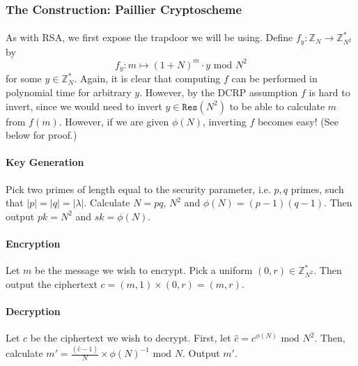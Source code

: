 \documentclass{article}
\theoremstyle{definition}
\theoremstyle{example}
\newcommand{\Int}{\mathbb{Z}}
\renewcommand{\mod}{\,\,\text{mod}\,\,}
\begin{document}
\subsubsection{The Construction: Paillier Cryptoscheme}
\paragraph{} As with RSA, we first expose the trapdoor we will be using. Define
$f_y: \Int_N \to \Int_{N^2}^*$ by
\[
  f_y: m \mapsto (1 + N)^m \cdot y \mod N^2 
\]
for some $y \in \Int_N^*$. Again, it is clear that computing $f$ can be
performed in polynomial time for arbitrary $y$. However, by the DCRP assumption
$f$ is hard to invert, since we would need to invert $y \in \texttt{Res}(N^2)$
to be able to calculate $m$ from $f(m)$. However, if we are given $\phi(N)$,
inverting $f$ becomes easy! (See below for proof.)
\paragraph{Key Generation}
Pick two primes of length equal to the security parameter, i.e. $p, q$ primes,
such that $|p| = |q| = |\lambda|$. Calculate $N = pq$, $N^2$ and $\phi(N) = (p -
1)(q - 1)$.
Then output $pk = N^2$ and $sk = \phi(N)$.
\paragraph{Encryption}
Let $m$ be the message we wish to encrypt. Pick a uniform $(0, r) \in
\Int_{N^2}^*$. Then output the ciphertext $c = (m, 1) \times (0, r) = (m, r)$.
\paragraph{Decryption} 
Let $c$ be the ciphertext we wish to decrypt. First, let $\hat{c} = c^{\phi(N)}
\mod N^2$. Then, calculate $m' = \frac{(\hat{c} - 1)}{N} \times \phi(N)^{-1} \mod N$.
Output $m'$.
\end{document}
